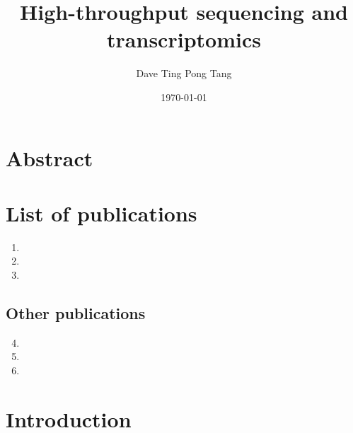 \documentclass[10pt,a4paper]{report}
\begin{document}
%

\title{
   {High-throughput sequencing and transcriptomics}
}

\author{Dave Ting Pong Tang}
\date{\today}
\maketitle

%

\chapter*{Abstract}


\chapter*{List of publications}

\begin{enumerate}
   \item {}
   \item {}
   \item {}
\end{enumerate}

\section*{Other publications}

\begin{enumerate}
   \setcounter{enumi}{3}
   \item {}
   \item {}
   \item {}
\end{enumerate}

\tableofcontents
\listoffigures
\listoftables




\chapter{Introduction}\label{intro}

\end{document}

